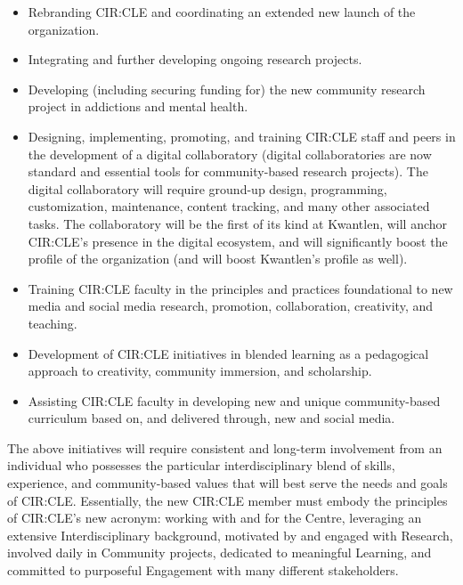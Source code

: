\documentclass[12pt,DIV11,letterpaper,oneside,abstractoff,headsepline]{scrreprt}
\begin{document}
\begin{itemize}
\item Rebranding CIR:CLE and coordinating an extended new launch of the organization.
\item Integrating and further developing ongoing research projects.
\item Developing (including securing funding for) the new community research project in addictions and mental health.
\item Designing, implementing, promoting, and training CIR:CLE staff and peers in the development of a digital collaboratory (digital collaboratories are now standard and essential tools for community-based research projects). The digital collaboratory will require ground-up design, programming, customization, maintenance, content tracking, and many other associated tasks. The collaboratory will be the first of its kind at Kwantlen, will anchor CIR:CLE's presence in the digital ecosystem, and will significantly boost the profile of the organization (and will boost Kwantlen's profile as well).
\item Training CIR:CLE faculty in the principles and practices foundational to new media and social media research, promotion, collaboration, creativity, and teaching.
\item Development of CIR:CLE initiatives in blended learning as a pedagogical approach to creativity, community immersion, and scholarship.
\item Assisting CIR:CLE faculty in developing new and unique community-based curriculum based on, and delivered through, new and social media.
\end{itemize}

The above initiatives will require consistent and long-term involvement from an individual who possesses the particular interdisciplinary blend of skills, experience, and community-based values that will best serve the needs and goals of CIR:CLE. Essentially, the new CIR:CLE member must embody the principles of CIR:CLE's new acronym: working with and for the Centre, leveraging an extensive Interdisciplinary background, motivated by and engaged with Research, involved daily in Community projects, dedicated to meaningful Learning, and committed to purposeful Engagement with many different stakeholders.
\end{document}
